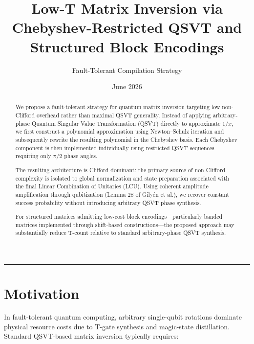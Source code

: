 \documentclass[12pt,a4paper]{article}
\begin{document}
\title{
\textbf{
Low-T Matrix Inversion via\\
Chebyshev-Restricted QSVT and Structured Block Encodings
}
}

\author{
Fault-Tolerant Compilation Strategy
}

\date{June 2026}

\maketitle

\begin{abstract}
We propose a fault-tolerant strategy for quantum matrix inversion targeting low non-Clifford overhead rather than maximal QSVT generality. Instead of applying arbitrary-phase Quantum Singular Value Transformation (QSVT) directly to approximate $1/x$, we first construct a polynomial approximation using Newton--Schulz iteration and subsequently rewrite the resulting polynomial in the Chebyshev basis. Each Chebyshev component is then implemented individually using restricted QSVT sequences requiring only $\pi/2$ phase angles. 

The resulting architecture is Clifford-dominant: the primary source of non-Clifford complexity is isolated to global normalization and state preparation associated with the final Linear Combination of Unitaries (LCU). Using coherent amplitude amplification through qubitization (Lemma 28 of Gily\'en et al.), we recover constant success probability without introducing arbitrary QSVT phase synthesis.

For structured matrices admitting low-cost block encodings---particularly banded matrices implemented through shift-based constructions---the proposed approach may substantially reduce T-count relative to standard arbitrary-phase QSVT synthesis.
\end{abstract}

\tableofcontents

\vspace{1em}
\hrule
\vspace{1em}


\section{Motivation}

In fault-tolerant quantum computing, arbitrary single-qubit rotations dominate physical resource costs due to T-gate synthesis and magic-state distillation. Standard QSVT-based matrix inversion typically requires:
\end{document}
